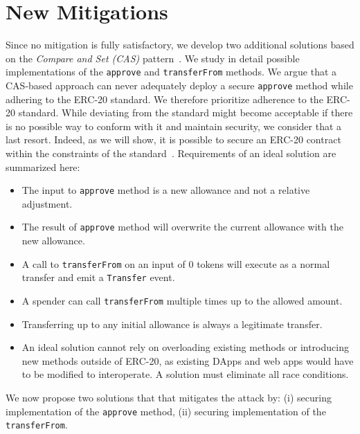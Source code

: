 \section{New Mitigations}
Since no mitigation is fully satisfactory, we develop two additional solutions based on the \textit{Compare and Set (CAS)} pattern~\cite{CompareSwap}. We study in detail possible implementations of the \texttt{approve} and \texttt{transferFrom} methods. We argue that a CAS-based approach can never adequately deploy a secure \texttt{approve} method while adhering to the ERC-20 standard. We therefore prioritize adherence to the ERC-20 standard. While deviating from the standard might become acceptable if there is no possible way to conform with it and maintain security, we consider that a last resort. Indeed, as we will show, it is possible to secure an ERC-20 contract within the constraints of the standard~\cite{Interface}. Requirements of an ideal solution are summarized here:
\begin{itemize}
	\item The input to \texttt{approve} method is a new allowance and not a relative adjustment.
	\item The result of \texttt{approve} method will overwrite the current allowance with the new allowance.
	\item A call to \texttt{transferFrom} on an input of 0 tokens will execute as a normal transfer and emit a \texttt{Transfer} event.
	\item A spender can call \texttt{transferFrom} multiple times up to the allowed amount.
	\item Transferring up to any initial allowance is always a legitimate transfer.
	\item An ideal solution cannot rely on overloading existing methods or introducing new methods outside of ERC-20, as existing DApps and web apps would have to be modified to interoperate. A solution must eliminate all race conditions.
\end{itemize}
We now propose two solutions that that mitigates the attack by: (i) securing implementation of the \texttt{approve} method, (ii) securing implementation of the \texttt{transferFrom}.

